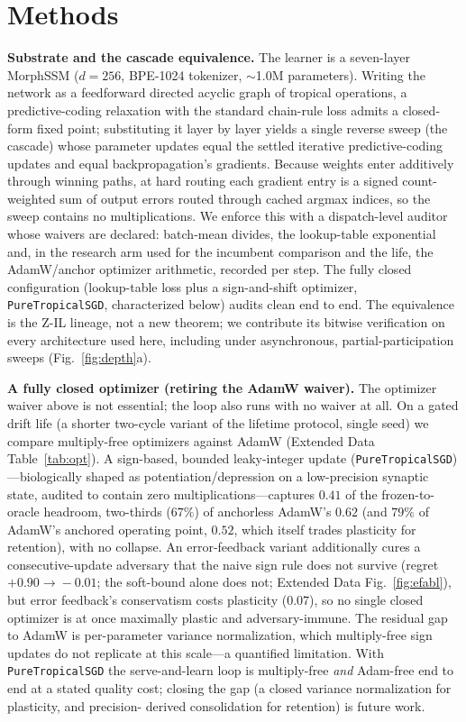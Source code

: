 \documentclass[11pt]{article}
\newcommand{\heading}[1]{\vspace{4pt}\noindent\textbf{#1}\hspace{0.6em}}
\begin{document}
\section*{Methods}
\small

\heading{Substrate and the cascade equivalence.}
The learner is a seven-layer MorphSSM ($d{=}256$, BPE-1024 tokenizer,
$\sim$1.0M parameters). Writing the network as a feedforward directed acyclic
graph of tropical operations, a predictive-coding relaxation with the standard
chain-rule loss admits a closed-form fixed point; substituting it layer by layer
yields a single reverse sweep (the cascade) whose parameter updates equal the
settled iterative predictive-coding updates and equal backpropagation's
gradients. Because weights enter additively through winning paths, at hard
routing each gradient entry is a signed count-weighted sum of output errors
routed through cached argmax indices, so the sweep contains no multiplications.
We enforce this with a dispatch-level auditor whose waivers are declared:
batch-mean divides, the lookup-table exponential and, in the research arm used
for the incumbent comparison and the life, the AdamW/anchor optimizer arithmetic,
recorded per step. The fully closed configuration (lookup-table loss plus a
sign-and-shift optimizer, \texttt{PureTropicalSGD}, characterized below) audits
clean end to end. The equivalence is the Z-IL
lineage\cite{song2020can}, not a new theorem; we contribute its bitwise
verification on every architecture used here, including under asynchronous,
partial-participation sweeps (Fig.~\ref{fig:depth}a).

\heading{A fully closed optimizer (retiring the AdamW waiver).}
The optimizer waiver above is not essential; the loop also runs with no waiver at
all. On a gated drift life (a shorter two-cycle variant of the lifetime protocol,
single seed) we compare multiply-free optimizers against AdamW (Extended Data
Table~\ref{tab:opt}). A sign-based, bounded leaky-integer update
(\texttt{PureTropicalSGD})---biologically shaped as potentiation/depression on a
low-precision synaptic state\cite{bartol2015nanoconnectomic}, audited to contain
zero multiplications---captures $0.41$ of the frozen-to-oracle headroom,
two-thirds ($67\%$) of anchorless AdamW's $0.62$ (and $79\%$ of AdamW's anchored
operating point, $0.52$, which itself trades plasticity for retention), with no
collapse. An error-feedback
variant additionally cures a consecutive-update adversary that the naive sign rule
does not survive (regret $+0.90\!\to\!-0.01$; the soft-bound alone does not;
Extended Data Fig.~\ref{fig:efabl}), but error feedback's conservatism costs
plasticity ($0.07$), so no single closed optimizer is at once maximally plastic and
adversary-immune. The residual gap to AdamW is per-parameter variance
normalization, which multiply-free sign updates do not replicate at this
scale---a quantified limitation. With \texttt{PureTropicalSGD} the serve-and-learn
loop is multiply-free \emph{and} Adam-free end to end at a stated quality cost;
closing the gap (a closed variance normalization for plasticity, and precision-%
derived consolidation for retention) is future work.
\end{document}
